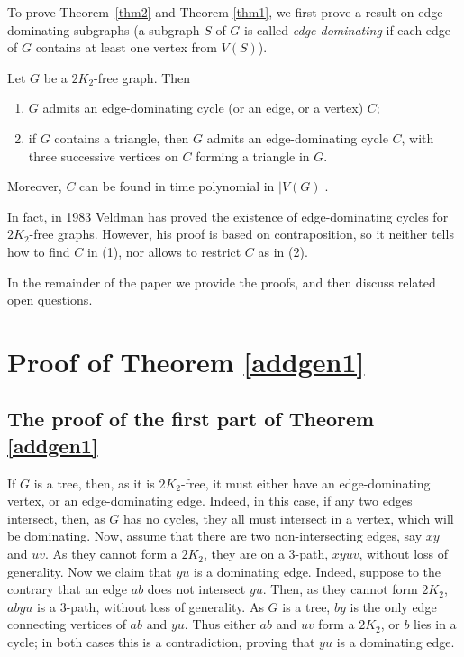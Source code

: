 \documentclass{ws-jktr}
\begin{document}
To prove Theorem~\ref{thm2} and Theorem \ref{thm1}, we first prove
a result on edge-dominating subgraphs (a subgraph $S$ of $G$ is called {\em edge-dominating}
if each edge of $G$ contains at least one vertex from $V(S)$).
\begin{theorem}\label{addgen1}
Let $G$ be a $2K_2$-free graph. Then
\begin{enumerate}
\item $G$ admits an edge-dominating cycle (or an edge, or a vertex) $C$;
\item if $G$ contains a triangle, then $G$ admits
an edge-dominating cycle $C$, with three successive vertices on $C$ forming a triangle in $G$.
\end{enumerate}
Moreover, $C$ can be found in time polynomial in $|V(G)|$.
\end{theorem}

In fact, in 1983 Veldman \cite{veldman83} has proved the existence of
edge-dominating cycles for $2K_2$-free graphs. However, his proof is based on
contraposition, so it neither tells how to find $C$ in (1), nor
allows to restrict $C$ as in (2).

In the remainder of the paper we provide the proofs, and then discuss related
open questions.


\section{Proof of Theorem \ref{addgen1}}

\subsection{The proof of the first part of Theorem \ref{addgen1}}
If $G$ is a tree, then, as it is $2K_2$-free, it must either have an edge-dominating
vertex, or an edge-dominating edge.
Indeed, in this case, if any two edges intersect, then, as $G$ has no cycles,
they all must intersect in a vertex, which will be dominating. Now, assume that there are
two non-intersecting edges, say $xy$ and $uv$. As they cannot form a $2K_2$, they are on
a 3-path, $xyuv$, without loss of generality. Now we claim that $yu$ is a dominating edge.
Indeed, suppose to the contrary that an edge $ab$ does not intersect $yu$. Then, as they
cannot form $2K_2$, $abyu$ is a 3-path, without loss of generality. As $G$ is a tree, $by$
is the only edge connecting vertices of $ab$ and $yu$. Thus either
$ab$ and $uv$ form a $2K_2$, or $b$ lies in a cycle; in both cases this is a contradiction,
proving that $yu$ is a dominating edge.
\end{document}
